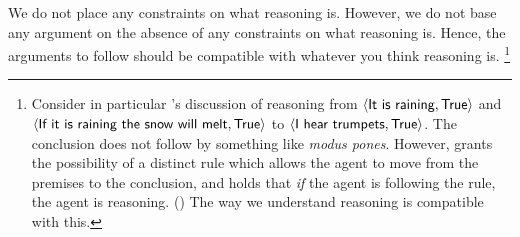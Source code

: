 \begin{note}
  We do not place any constraints on what reasoning is.
  However, we do not base any argument on the absence of any constraints on what reasoning is.
  Hence, the arguments to follow should be compatible with whatever you think reasoning is.%
  \footnote{
    Consider in particular \citeauthor{Broome:2013aa}'s discussion of reasoning from \(\pv{\propI{It is raining}}{\valI{True}}\) and \(\pv{\propI{If it is raining the snow will melt}}{\valI{True}}\) to \(\pv{\propI{I hear trumpets}}{\valI{True}}\).
    The conclusion does not follow by something like \emph{modus pones}.
    However, \citeauthor{Broome:2013aa} grants the possibility of a distinct rule which allows the agent to move from the premises to the conclusion, and holds that \emph{if} the agent is following the rule, the agent is reasoning.
    (\citeyear[233]{Broome:2013aa})
    The way we understand reasoning is compatible with this.
  }%




\end{note}

